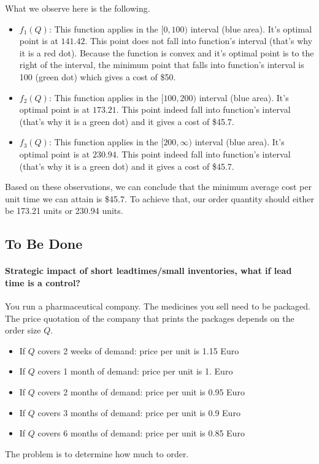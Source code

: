 \begin{exercise}
\begin{solution}
What we observe here is the following.
\begin{itemize}
\item $f_1(Q)$: This function applies in the $[0,100)$ interval (blue area). It's optimal point is at $141.42$. This point does not fall into function's interval (that's why it is a red dot). Because the function is convex and it's optimal point is to the right of the interval, the minimum point that falls into function's interval is 100 (green dot) which gives a cost of \$50. 
\item $f_2(Q)$: This function applies in the $[100,200)$ interval (blue area). It's optimal point is at $173.21$. This point indeed fall into function's interval (that's why it is a green dot) and it gives a cost of \$45.7. 
\item $f_3(Q)$: This function applies in the $[200,\infty)$ interval (blue area). It's optimal point is at $230.94$. This point indeed fall into function's interval (that's why it is a green dot) and it gives a cost of \$45.7.  
\end{itemize}

Based on these observations, we can conclude that the minimum average cost per unit time we can attain is \$45.7. To achieve that, our order quantity should either be 173.21 units or 230.94 units.
\end{solution}
\end{exercise}


\subsection{To Be Done}
\label{sec:be-done}

\paragraph{Strategic impact of short leadtimes/small inventories,
 what if lead time is a control?}

You run a pharmaceutical company. The medicines you sell need to be
packaged. The price quotation of the company that prints the packages
depends on the order size $Q$.
 \begin{itemize}
 \item If $Q$ covers 2 weeks of demand: price per unit is 1.15 Euro
 \item If $Q$ covers 1 month of demand: price per unit is 1. Euro
 \item If $Q$ covers 2 months of demand: price per unit is 0.95 Euro
 \item If $Q$ covers 3 months of demand: price per unit is 0.9 Euro
 \item If $Q$ covers 6 months of demand: price per unit is 0.85 Euro
 \end{itemize}
The problem is to determine how much to order.

